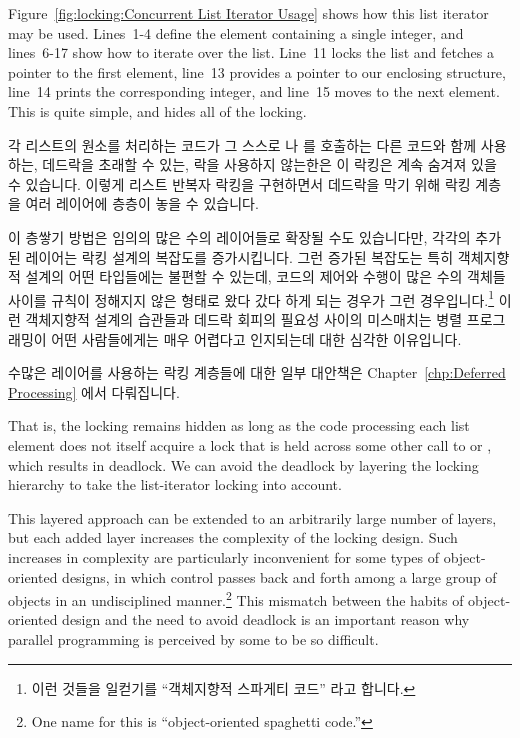 Figure~\ref{fig:locking:Concurrent List Iterator Usage} shows how
this list iterator may be used.
Lines~1-4 define the  element containing a single integer,
and lines~6-17 show how to iterate over the list.
Line~11 locks the list and fetches a pointer to the first element,
line~13 provides a pointer to our enclosing  structure,
line~14 prints the corresponding integer, and
line~15 moves to the next element.
This is quite simple, and hides all of the locking.
\fi

각 리스트의 원소를 처리하는 코드가 그 스스로  나
 를 호출하는 다른 코드와 함께 사용하는, 데드락을 초래할 수
있는, 락을 사용하지 않는한은 이 락킹은 계속 숨겨져 있을 수 있습니다.
이렇게 리스트 반복자 락킹을 구현하면서 데드락을 막기 위해 락킹 계층을 여러
레이어에 층층이 놓을 수 있습니다.

이 층쌓기 방법은 임의의 많은 수의 레이어들로 확장될 수도 있습니다만, 각각의
추가된 레이어는 락킹 설계의 복잡도를 증가시킵니다.
그런 증가된 복잡도는 특히 객체지향적 설계의 어떤 타입들에는 불편할 수 있는데,
코드의 제어와 수행이 많은 수의 객체들 사이를 규칙이 정해지지 않은 형태로 왔다
갔다 하게 되는 경우가 그런 경우입니다.\footnote{
	이런 것들을 일컫기를 ``객체지향적 스파게티 코드'' 라고 합니다.}
이런 객체지향적 설계의 습관들과 데드락 회피의 필요성 사이의 미스매치는 병렬
프로그래밍이 어떤 사람들에게는 매우 어렵다고 인지되는데 대한 심각한 이유입니다.

수많은 레이어를 사용하는 락킹 계층들에 대한 일부 대안책은
Chapter~\ref{chp:Deferred Processing} 에서 다뤄집니다.
\iffalse

That is, the locking remains hidden as long as the code processing each
list element does not itself acquire a lock that is held across some
other call to  or , which results in
deadlock.
We can avoid the deadlock by layering the locking hierarchy
to take the list-iterator locking into account.

This layered approach can be extended to an arbitrarily large number of layers,
but each added layer increases the complexity of the locking design.
Such increases in complexity are particularly inconvenient for some
types of object-oriented designs, in which control passes back and forth
among a large group of objects in an undisciplined manner.\footnote{
	One name for this is ``object-oriented spaghetti code.''}
This mismatch between the habits of object-oriented design and the
need to avoid deadlock is an important reason why parallel programming
is perceived by some to be so difficult.

